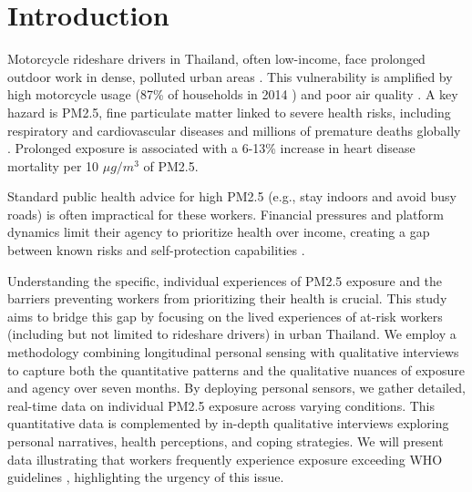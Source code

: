 \documentclass[sigconf,screen,natbib=true]{acmart}
\begin{document}
\section{Introduction}





Motorcycle rideshare drivers in Thailand, often low-income, face prolonged outdoor work in dense, polluted urban areas \cite{tieanklin2024rideshare}.
This vulnerability is amplified by high motorcycle usage (87\% of households in 2014 \cite{Poushter2015motorcyclestat}) and poor air quality \cite{iqr_rank}.
A key hazard is PM2.5, fine particulate matter linked to severe health risks, including respiratory and cardiovascular diseases and millions of premature deaths globally \cite{who_ambient_air_pollution}.
Prolonged exposure is associated with a 6-13\% increase in heart disease mortality per 10 $\mu g/m^3$ of PM2.5.

Standard public health advice for high PM2.5 (e.g., stay indoors and avoid busy roads) \cite{cdc_pm25} is often impractical for these workers.
Financial pressures and platform dynamics limit their agency to prioritize health over income, creating a gap between known risks and self-protection capabilities \cite{tieanklin2024rideshare}.







Understanding the specific, individual experiences of PM2.5 exposure and the barriers preventing workers from prioritizing their health is crucial.
This study aims to bridge this gap by focusing on the lived experiences of at-risk workers (including but not limited to rideshare drivers) in urban Thailand.
We employ a methodology combining longitudinal personal sensing with qualitative interviews to capture both the quantitative patterns and the qualitative nuances of exposure and agency over seven months.
By deploying personal sensors, we gather detailed, real-time data on individual PM2.5 exposure across varying conditions.
This quantitative data is complemented by in-depth qualitative interviews exploring personal narratives, health perceptions, and coping strategies.
We will present data illustrating that workers frequently experience exposure exceeding WHO guidelines \cite{who_aqg_2021}, highlighting the urgency of this issue.
\end{document}

